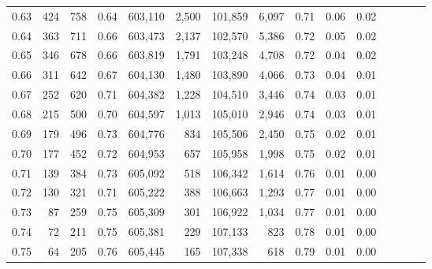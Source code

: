 \begin{tabular}{rrrcrrrrrrrrrrr}
0.63 &     424 &    758 &                                       0.64 &  603,110 &    2,500 &  101,859 &    6,097 &  0.71 &  0.06 &                         0.02 \\
0.64 &     363 &    711 &                                       0.66 &  603,473 &    2,137 &  102,570 &    5,386 &  0.72 &  0.05 &                         0.02 \\
0.65 &     346 &    678 &                                       0.66 &  603,819 &    1,791 &  103,248 &    4,708 &  0.72 &  0.04 &                         0.02 \\
0.66 &     311 &    642 &                                       0.67 &  604,130 &    1,480 &  103,890 &    4,066 &  0.73 &  0.04 &                         0.01 \\
0.67 &     252 &    620 &                                       0.71 &  604,382 &    1,228 &  104,510 &    3,446 &  0.74 &  0.03 &                         0.01 \\
0.68 &     215 &    500 &                                       0.70 &  604,597 &    1,013 &  105,010 &    2,946 &  0.74 &  0.03 &                         0.01 \\
0.69 &     179 &    496 &                                       0.73 &  604,776 &      834 &  105,506 &    2,450 &  0.75 &  0.02 &                         0.01 \\
0.70 &     177 &    452 &                                       0.72 &  604,953 &      657 &  105,958 &    1,998 &  0.75 &  0.02 &                         0.01 \\
0.71 &     139 &    384 &                                       0.73 &  605,092 &      518 &  106,342 &    1,614 &  0.76 &  0.01 &                         0.00 \\
0.72 &     130 &    321 &                                       0.71 &  605,222 &      388 &  106,663 &    1,293 &  0.77 &  0.01 &                         0.00 \\
0.73 &      87 &    259 &                                       0.75 &  605,309 &      301 &  106,922 &    1,034 &  0.77 &  0.01 &                         0.00 \\
0.74 &      72 &    211 &                                       0.75 &  605,381 &      229 &  107,133 &      823 &  0.78 &  0.01 &                         0.00 \\
0.75 &      64 &    205 &                                       0.76 &  605,445 &      165 &  107,338 &      618 &  0.79 &  0.01 &                         0.00 \\

\end{tabular}

